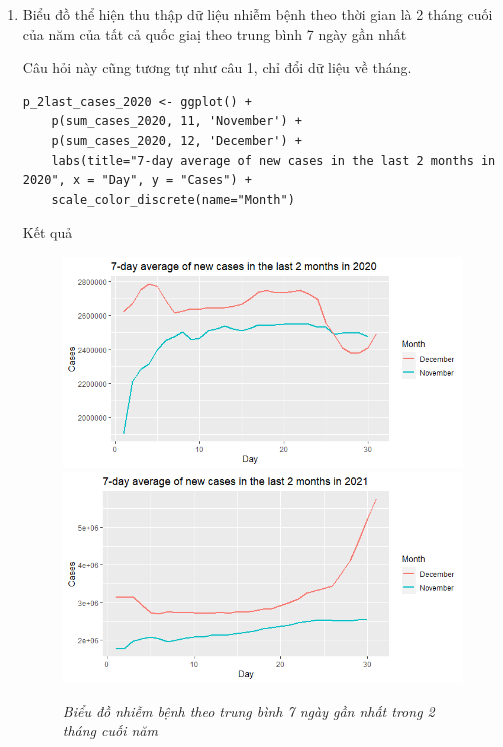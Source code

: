 \documentclass[a4paper]{article}
\theoremstyle{definition}
\begin{document}
\begin{enumerate}[1)]
    \item Biểu đồ thể hiện thu thập dữ liệu nhiễm bệnh theo thời gian là 2 tháng cuối của năm của tất cả quốc giaị theo trung bình 7 ngày gần nhất
    
    Câu hỏi này cũng tương tự như câu 1, chỉ đổi dữ liệu về tháng.
    
    \begin{lstlisting}
p_2last_cases_2020 <- ggplot() + 
    p(sum_cases_2020, 11, 'November') + 
    p(sum_cases_2020, 12, 'December') + 
    labs(title="7-day average of new cases in the last 2 months in 2020", x = "Day", y = "Cases") + 
    scale_color_discrete(name="Month")
    \end{lstlisting}
    
    Kết quả
    
    \begin{figure}[H]
        \begin{center}
        \includegraphics[scale = .5]{viii/last2 2020cases.png}
        \includegraphics[scale = .5]{viii/last2 2021cases.png}
        \end{center}
        \vspace{+3mm}\caption{\it Biểu đồ nhiễm bệnh theo trung bình 7 ngày gần nhất trong 2 tháng cuối năm}
    \end{figure}
    

\end{enumerate}
\end{document}
